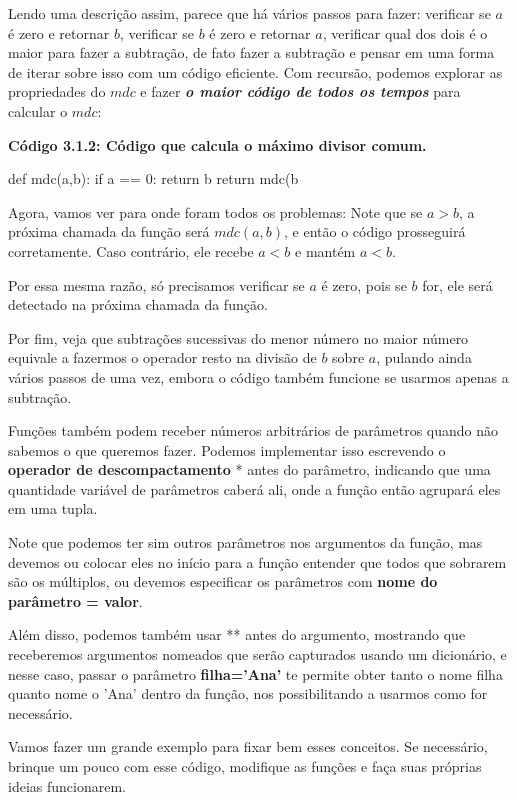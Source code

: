 \documentclass[11pt, a4paper]{article}
\begin{document}
Lendo uma descrição assim, parece que há vários passos para fazer: verificar se \(a\) é zero e retornar \(b\), verificar se \(b\) é zero e retornar \(a\), verificar qual dos dois é o maior para fazer a subtração, de fato fazer a subtração e pensar em uma forma de iterar sobre isso com um código eficiente. Com recursão, podemos explorar as propriedades do \(mdc\) e fazer \textbf{\textit{o maior código de todos os tempos}} para calcular o \(mdc\):

\textbf{Código 3.1.2: Código que calcula o máximo divisor comum.}

\begin{code}
def mdc(a,b):
    if a == 0:
        return b
    return mdc(b%
\end{code}

Agora, vamos ver para onde foram todos os problemas: Note que se \(a > b\),  a próxima chamada da função será \(mdc(a,b)\), e então o código prosseguirá corretamente. Caso contrário, ele recebe \(a<b\) e mantém \(a<b\).

Por essa mesma razão, só precisamos verificar se \(a\) é zero, pois se \(b\) for, ele será detectado na próxima chamada da função. 

Por fim, veja que subtrações sucessivas do menor número no maior número equivale a fazermos o operador resto na divisão de \(b\) sobre \(a\), pulando ainda vários passos de uma vez, embora o código também funcione se usarmos apenas a subtração.

Funções também podem receber números arbitrários de parâmetros quando não sabemos o que queremos fazer. Podemos implementar isso escrevendo o \textbf{operador de descompactamento} * antes do parâmetro, indicando que uma quantidade variável de parâmetros caberá ali, onde a função então agrupará eles em uma tupla. 

Note que podemos ter sim outros parâmetros nos argumentos da função, mas devemos ou colocar eles no início para a função entender que todos que sobrarem são os múltiplos, ou devemos especificar os parâmetros com \textbf{nome do parâmetro = valor}.

Além disso, podemos também usar ** antes do argumento, mostrando que receberemos argumentos nomeados que serão capturados usando um dicionário, e nesse caso, passar o parâmetro \textbf{filha='Ana'} te permite obter tanto o nome filha quanto nome o 'Ana' dentro da função, nos possibilitando a usarmos como for necessário.

Vamos fazer um grande exemplo para fixar bem esses conceitos. Se necessário, brinque um pouco com esse código, modifique as funções e faça suas próprias ideias funcionarem.
\end{document}
